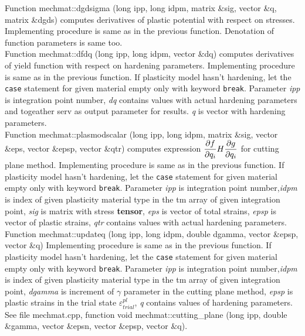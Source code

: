 Function {\sf mechmat::dgdsigma (long ipp, long idpm, matrix \&sig, vector \&q, matrix \&dgds)} computes derivatives of plastic
potential with respect on stresses. Implementing procedure is same as in the previous function. Denotation of function
parameters is same too.\\

Function {\sf mechmat::dfdq (long ipp, long idpm, vector \&dq)} computes derivatives of yield function with respect on hardening
parameters. Implementing procedure is same as in the previous function. If plasticity model hasn't hardening, let
the {\tt case} statement for given material empty only with keyword {\tt break}. Parameter {\it ipp} is integration
point number, {\it dq} contains values with actual hardening parameters and togeather serv as output parameter for results.
{\it q} is vector with hardening parameters.\\

Function {\sf mechmat::plasmodscalar (long ipp, long idpm, matrix \&sig, vector \&eps, vector \&epsp, vector \&qtr)} computes
expression $\mbox{$\displaystyle\frac{\partial{f}}{\partial{q_i}}$}H\mbox{$\displaystyle\frac{\partial{g}}{\partial{q_i}}$}$ for cutting plane method. Implementing procedure is same as in the previous function.
If plasticity model hasn't hardening, let the {\tt case} statement for given material empty only with keyword {\tt break}.
Parameter {\it ipp} is integration point number,{\it idpm} is index of given plasticity material type in the {\sf tm} array 
of given integration point, {\it sig} is matrix with stress {\bf tensor}, {\it eps} is vector of total strains, {\it epsp} is vector of plastic strains, 
{\it qtr} contains values with actual hardening parameters.\\

Function {\sf mechmat::updateq (long ipp, long idpm, double dgamma, vector \&epsp, vector \&q)}
Implementing procedure is same as in the previous function. If plasticity model hasn't hardening, let the {\tt case}
statement for given material empty only with keyword {\tt break}. Parameter {\it ipp} is integration point number,{\it idpm} is 
index of given plasticity material type in the {\sf tm} array of given integration point,
{\it dgamma} is increment of $\gamma$ parameter in the cutting plane method, {\it epsp} is plastic strains in the
trial state $\varepsilon^{pl}_{trial}$, {\it q} contains values of hardening parameters. See file mechmat.cpp, function
{\sf void mechmat::cutting\_plane (long ipp, double \&gamma, vector \&epsn, vector $\&$epsp, vector $\&$q)}.\\

